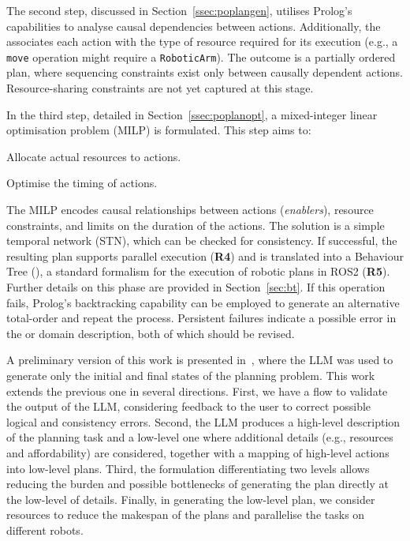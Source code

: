 The second step, discussed in Section~\ref{ssec:poplangen}, utilises
Prolog's capabilities to analyse causal dependencies between
actions. Additionally, the \kb associates each action with the type of
resource required for its execution (e.g., a \verb|move| operation
might require a \verb|RoboticArm|). The outcome is a partially ordered
plan, where sequencing constraints exist only between causally
dependent actions. Resource-sharing constraints are not yet captured
at this stage.

In the third step, detailed in Section~\ref{ssec:poplanopt}, a
mixed-integer linear optimisation problem (MILP) is formulated. This
step aims to: 
\begin{enumerate*}
    \item Allocate actual resources to actions.  
    \item Optimise the timing of actions.  
\end{enumerate*}
The MILP encodes causal relationships between
actions (\emph{enablers}), resource constraints, and limits on the duration of the actions. The solution is a simple temporal network (STN), which can be checked for consistency. If successful, the resulting plan
supports parallel execution (\textbf{R4}) and is translated into a Behaviour Tree (\bt), a standard formalism for the execution of robotic plans in ROS2 (\textbf{R5}). Further details on this phase are provided in Section~\ref{sec:bt}.
If this operation fails, Prolog's backtracking capability can be
employed to generate an alternative total-order and repeat the
process. Persistent failures indicate a possible error in the \kb or
domain description, both of which should be revised.

A preliminary version of this work is presented in~\cite{saccon2023prolog}, where the LLM was used to generate only the initial and final states of the planning problem. This work extends the previous one in several directions. 
%
First, we have a flow to validate the output of the LLM, considering feedback to the user to correct possible logical and consistency errors.
%
Second, the LLM produces a high-level description of the planning task and a low-level one where additional details (e.g., resources and affordability) are considered, together with a mapping of high-level actions into low-level plans. 
%
Third, the formulation differentiating two levels allows reducing the burden and possible bottlenecks of generating the plan directly at the low-level of details.
%
Finally, in generating the low-level plan, we consider resources to reduce the makespan of the plans and parallelise the tasks on different robots.

